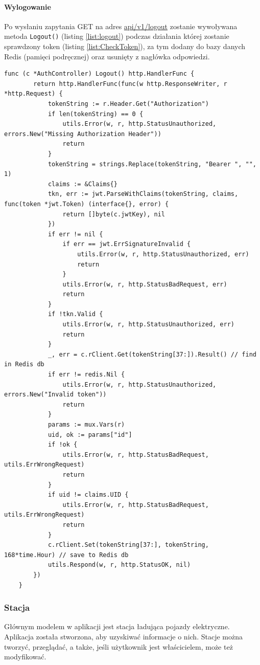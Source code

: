 \paragraph{Wylogowanie\newline}
Po wysłaniu zapytania GET na adres \url{api/v1/logout} zostanie wywoływana metoda \texttt{Logout()} (listing \ref{list:logout}) podczas działania której zostanie sprawdzony token (listing \ref{list:CheckToken}), za tym dodany do bazy danych Redis (pamięci podręcznej) oraz usunięty z nagłówka odpowiedzi.
\begin{lstlisting}[label=list:logout,caption=Wylogowanie,basicstyle=\tiny\ttfamily]
    func (c *AuthController) Logout() http.HandlerFunc {
        return http.HandlerFunc(func(w http.ResponseWriter, r *http.Request) {
            tokenString := r.Header.Get("Authorization")
            if len(tokenString) == 0 {
                utils.Error(w, r, http.StatusUnauthorized, errors.New("Missing Authorization Header"))
                return
            }
            tokenString = strings.Replace(tokenString, "Bearer ", "", 1)
            claims := &Claims{}
            tkn, err := jwt.ParseWithClaims(tokenString, claims, func(token *jwt.Token) (interface{}, error) {
                return []byte(c.jwtKey), nil
            })
            if err != nil {
                if err == jwt.ErrSignatureInvalid {
                    utils.Error(w, r, http.StatusUnauthorized, err)
                    return
                }
                utils.Error(w, r, http.StatusBadRequest, err)
                return
            }
            if !tkn.Valid {
                utils.Error(w, r, http.StatusUnauthorized, err)
                return
            }
            _, err = c.rClient.Get(tokenString[37:]).Result() // find in Redis db
            if err != redis.Nil {
                utils.Error(w, r, http.StatusUnauthorized, errors.New("Invalid token"))
                return
            }
            params := mux.Vars(r)
            uid, ok := params["id"]
            if !ok {
                utils.Error(w, r, http.StatusBadRequest, utils.ErrWrongRequest)
                return
            }
            if uid != claims.UID {
                utils.Error(w, r, http.StatusBadRequest, utils.ErrWrongRequest)
                return
            }
            c.rClient.Set(tokenString[37:], tokenString, 168*time.Hour) // save to Redis db
            utils.Respond(w, r, http.StatusOK, nil)
        })
    }
\end{lstlisting}

\subsubsection{Stacja}
Głównym modelem w aplikacji jest stacja ładująca pojazdy elektryczne. Aplikacja została stworzona, aby uzyskiwać informacje o nich. Stacje można tworzyć, przeglądać, a także, jeśli użytkownik jest właścicielem, może też modyfikować.

